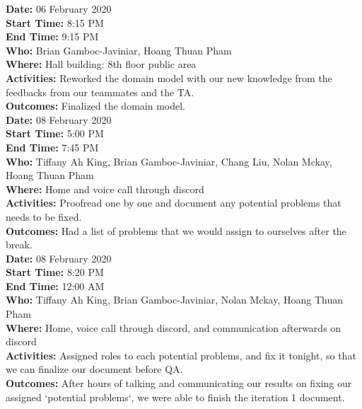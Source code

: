 \documentclass[12pt]{article}
\begin{document}
{\bf Date:} 06 February 2020\\
{\bf Start Time:} 8:15 PM\\
{\bf End Time:} 9:15 PM \\
{\bf Who:} Brian Gamboc-Javiniar, Hoang Thuan Pham\\
{\bf Where:} Hall building: 8th floor public area \\
{\bf Activities:} Reworked the domain model with our new knowledge from the feedbacks from our teammates and the TA.\\
{\bf Outcomes:} Finalized the domain model.\\

{\bf Date:} 08 February 2020\\
{\bf Start Time:} 5:00 PM\\
{\bf End Time:} 7:45 PM \\
{\bf Who:} Tiffany Ah King, Brian Gamboc-Javiniar, Chang Liu, Nolan Mckay, Hoang Thuan Pham\\
{\bf Where:} Home and voice call through discord \\
{\bf Activities:} Proofread one by one and document any potential problems that needs to be fixed.\\
{\bf Outcomes:} Had a list of problems that we would assign to ourselves after the break.\\

{\bf Date:} 08 February 2020\\
{\bf Start Time:} 8:20 PM\\
{\bf End Time:} 12:00 AM \\
{\bf Who:} Tiffany Ah King, Brian Gamboc-Javiniar, Nolan Mckay, Hoang Thuan Pham\\
{\bf Where:} Home, voice call through discord, and communication afterwards on discord \\
{\bf Activities:} Assigned roles to each potential problems, and fix it tonight, so that we can finalize our document before QA.\\
{\bf Outcomes:} After hours of talking and communicating our results on fixing our assigned `potential problems`, we were able to finish the iteration 1 document.\\



\end{document}
